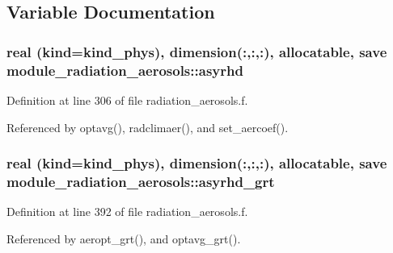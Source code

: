 \subsection{Variable Documentation}
\subsubsection[{\texorpdfstring{asyrhd}{asyrhd}}]{\setlength{\rightskip}{0pt plus 5cm}real (kind=kind\+\_\+phys), dimension(\+:,\+:,\+:), allocatable, save module\+\_\+radiation\+\_\+aerosols\+::asyrhd\hspace{0.3cm}{\ttfamily [private]}}\hypertarget{group__module__radiation__aerosols_ga090d37e62ba333db64e28bf89e89a08d}{}\label{group__module__radiation__aerosols_ga090d37e62ba333db64e28bf89e89a08d}


Definition at line 306 of file radiation\+\_\+aerosols.\+f.



Referenced by optavg(), radclimaer(), and set\+\_\+aercoef().

\subsubsection[{\texorpdfstring{asyrhd\+\_\+grt}{asyrhd_grt}}]{\setlength{\rightskip}{0pt plus 5cm}real (kind=kind\+\_\+phys), dimension(\+:,\+:,\+:), allocatable, save module\+\_\+radiation\+\_\+aerosols\+::asyrhd\+\_\+grt\hspace{0.3cm}{\ttfamily [private]}}\hypertarget{group__module__radiation__aerosols_ga2da45b8bd425415ca417f6590cc54da6}{}\label{group__module__radiation__aerosols_ga2da45b8bd425415ca417f6590cc54da6}


Definition at line 392 of file radiation\+\_\+aerosols.\+f.



Referenced by aeropt\+\_\+grt(), and optavg\+\_\+grt().


